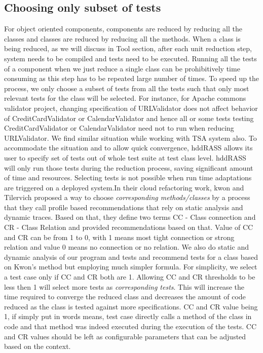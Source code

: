 \subsection{Choosing only subset of tests}
For object oriented components, components are reduced by reducing all the classes and classes are reduced by reducing all the methods. When a class is being reduced, as we will discuss in Tool section, after each unit reduction step, system needs to be compiled and tests need to be executed. Running all the tests of a component when we just reduce a single class can be prohibitively time consuming as this step has to be repeated large number of times. To speed up the process, we only choose a subset of tests from all the tests such that only most relevant tests for the class will be selected. For instance, for Apache commons validator project, changing specification of URLValidator does not affect behavior of CreditCardValidator or CalendarValidator and hence all or some tests testing CreditCardValidator or CalendarValidator need not to run when reducing URLValidator. We find similar situation while working with TSA system also. To accommodate the situation and to allow quick convergence, hddRASS allows its user to specify set of tests out of whole test suite at test class level. hddRASS will only run those tests during the reduction process, saving significant amount of time and resources. Selecting tests is not possible when run time adaptations are triggered on a deployed system.In their cloud refactoring work, kwon and Tilervich proposed a way to choose \emph{corresponding methods/classes}  by a process that they call profile based recommendations that rely on static analysis and dynamic traces. Based on that, they define two terms CC - Class connection and CR - Class Relation and provided recommendations based on that. Value of CC and CR can be from 1 to 0, with 1 means most tight connection or strong relation and value 0 means no connection or no relation. We also do static and dynamic analysis of our program and tests and recommend tests for a class based on Kwon's method but employing much simpler formula. For simplicity, we select a test case only if CC and CR both are 1. Allowing CC and CR thresholds to be less then 1 will select more tests as \emph{corresponding tests}. This will increase the time required to converge the reduced class and decreases the amount of code reduced as the class is tested against more specifications. CC and CR value being 1, if simply put in words means, test case directly calls a method of the class in code and that method was indeed executed during the execution of the tests. CC and CR values should be left as configurable parameters that can be adjusted based on the context.      
